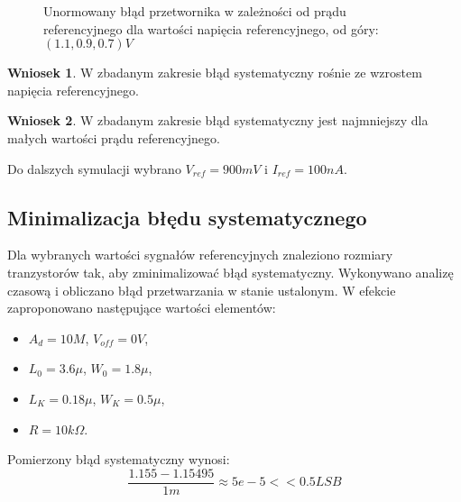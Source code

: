 \documentclass[10pt,a4paper,twoside]{report}
\theoremstyle{definition}
\theoremstyle{definition}
\theoremstyle{definition}
\theoremstyle{definition}
\theoremstyle{definition}
\newtheorem{wniosek}{Wniosek}[section]
\begin{document}
{{	\begin{figure}[!ht]
		\centering
		\caption{Unormowany błąd przetwornika w zależności od prądu referencyjnego dla wartości napięcia referencyjnego, od góry: $(1.1,0.9,0.7)V$}
		\label{i_u_delta2}
	\end{figure}
	
	\begin{wniosek}{W zbadanym zakresie błąd systematyczny rośnie ze wzrostem napięcia referencyjnego.}
	\end{wniosek}

	\begin{wniosek}{W zbadanym zakresie błąd systematyczny jest najmniejszy dla małych wartości prądu referencyjnego.}
	\end{wniosek}

	{	Do dalszych symulacji wybrano $V_{ref} = 900mV$ i $I_{ref} = 100nA$. }


	\subsection{Minimalizacja błędu systematycznego}
	{	Dla wybranych wartości sygnałów referencyjnych znaleziono rozmiary tranzystorów tak, aby zminimalizować błąd systematyczny. Wykonywano analizę czasową i obliczano błąd przetwarzania w stanie ustalonym. W efekcie zaproponowano następujące wartości elementów:
	\begin{itemize}
		\item $A_d = 10M$, $V_{off} = 0V$,
		\item $L_0 = 3.6\mu$, $W_0 = 1.8\mu$,
		\item $L_K = 0.18\mu$, $W_K = 0.5\mu$,
		\item $R = 10k \Omega$.
	\end{itemize}
	{ Pomierzony błąd systematyczny wynosi: 
		\begin{equation}
		 \frac{1.155- 1.15495}{1m} \approx 5e-5 << 0.5 LSB
		\end{equation} 
	}
	
}}}
\end{document}
